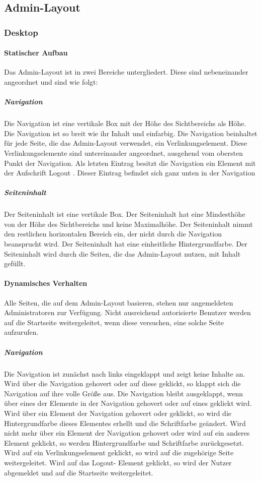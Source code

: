 \subsection{Admin-Layout}

\subsubsection{Desktop}
\paragraph*{Statischer Aufbau}
Das Admin-Layout ist in zwei Bereiche untergliedert. Diese sind nebeneinander angeordnet und sind wie folgt:

\subparagraph*{Navigation}
Die Navigation ist eine vertikale Box mit der Höhe des Sichtbereichs als Höhe.
Die Navigation ist so breit wie ihr Inhalt und einfarbig.
Die Navigation beinhaltet für jede Seite, die das Admin-Layout verwendet, ein Verlinkungselement. 
Diese Verlinkungselemente sind untereinander angeordnet, ausgehend vom obersten Punkt der Navigation.
Als letzten Eintrag besitzt die Navigation ein Element mit der Aufschrift \dq Logout \dq. Dieser Eintrag befindet sich ganz unten in der Navigation

\subparagraph*{Seiteninhalt}
Der Seiteninhalt ist eine vertikale Box. Der Seiteninhalt hat eine Mindesthöhe von der Höhe des Sichtbereichs und keine Maximalhöhe.
Der Seiteninhalt nimmt den restlichen horizontalen Bereich ein, der nicht durch die Navigation beansprucht wird.
Der Seiteninhalt hat eine einheitliche Hintergrundfarbe.
Der Seiteninhalt wird durch die Seiten, die das Admin-Layout nutzen, mit Inhalt gefüllt.

\paragraph*{Dynamisches Verhalten}
Alle Seiten, die auf dem Admin-Layout basieren, stehen nur angemeldeten Administratoren zur Verfügung. 
Nicht ausreichend autorisierte Benutzer werden auf die Startseite weitergeleitet, wenn diese versuchen, eine solche Seite aufzurufen.

\subparagraph*{Navigation}
Die Navigation ist zunächst nach links eingeklappt und zeigt keine Inhalte an. Wird über die Navigation gehovert oder auf diese geklickt,
so klappt sich die Navigation auf ihre volle Größe aus. Die Navigation bleibt ausgeklappt, wenn über eines der Elemente in der Navigation gehovert oder auf eines geklickt wird.
Wird über ein Element der Navigation gehovert oder geklickt, so wird die Hintergrundfarbe dieses Elementes erhellt und die Schriftfarbe geändert.
Wird nicht mehr über ein Element der Navigation gehovert oder wird auf ein anderes Element geklickt, so werden Hintergrundfarbe und Schriftfarbe zurückgesetzt.
Wird auf ein Verlinkungselement geklickt, so wird auf die zugehörige Seite weitergeleitet.
Wird auf das \dq Logout\dq - Element geklickt, so wird der Nutzer abgemeldet und auf die Startseite weitergeleitet.

